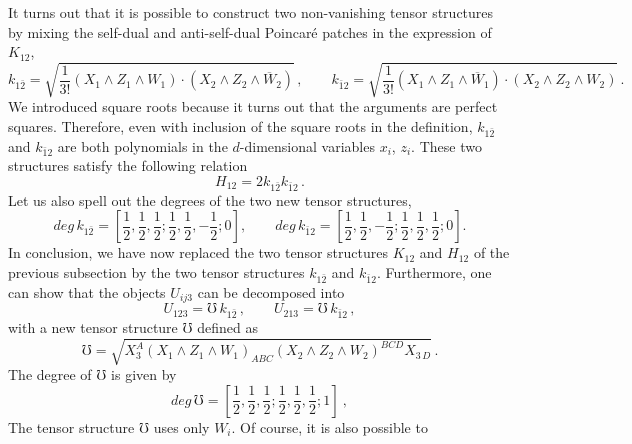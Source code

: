 \documentclass{article}
\def\mK{k}
\begin{document}
It turns out that it is possible to construct two non-vanishing tensor structures 
by mixing the self-dual and anti-self-dual Poincar\'e patches in the expression of $K_{12}$,
\begin{equation}
    \mK_{1\bar{2}}=\sqrt{\frac{1}{3!}\left(X_1\wedge Z_1\wedge W_1\right)\cdot \left(X_2\wedge 
    Z_2 \wedge \overline{W}_2\right)}\,, 
    \qquad \mK_{\bar{1}2}=\sqrt{\frac{1}{3!}\left(X_1\wedge Z_1\wedge \overline{W}_1\right)
    \cdot \left(X_2\wedge Z_2 \wedge W_2\right)}\,.
\end{equation}
We introduced square roots because it turns out 
that the arguments are perfect squares. Therefore, 
even with inclusion of the square roots in the definition, $\mK_{1\bar{2}}$ and
$\mK_{\bar{1}2}$ are both polynomials in the $d$-dimensional variables $x_i$, 
$z_i$. These two structures satisfy the following relation
\begin{equation}
    H_{12}= 2 \mK_{1\bar{2}} \mK_{\bar{1}2}\,. 
    \label{relationHKKbar}
\end{equation}
Let us also spell out the degrees of the two new tensor structures, 
\begin{equation}
    \textit{deg}\, \mK_{1\bar{2}}=\left[\frac{1}{2},\frac{1}{2},\frac{1}{2};\frac{1}{2},
    \frac{1}{2},-\frac{1}{2};0\right], \qquad \textit{deg}\,
    \mK_{\bar{1}2}=\left[\frac{1}{2},\frac{1}{2},-\frac{1}{2};\frac{1}{2},\frac{1}{2},
    \frac{1}{2};0\right]. 
\end{equation}
In conclusion, we have now replaced the two tensor structures $K_{12}$ and $H_{12}$ of the previous subsection by the two tensor structures $\mK_{1\bar{2}}$
and $\mK_{\bar{1}2}$. Furthermore, one can show that the objects $U_{ij3}$ can be 
decomposed into
\begin{equation}
    U_{123}=\mho\, \mK_{1\bar{2}}\,, \qquad U_{213}=\mho\, \mK_{\bar{1}2}\,,
    \label{Utensorstructure_mho}
\end{equation}
with a new tensor structure $\mho$ defined as 
\begin{equation}
    \mho = \sqrt{X_3^A\left(X_1\wedge Z_1\wedge W_1\right)_{ABC}
    \left(X_2\wedge Z_2 \wedge W_2\right)^{BCD} X_{3\,D}}\,.
\end{equation}
The degree of $\mho$ is given by 
\begin{equation}
    \textit{deg}\, \mho =\left[\frac{1}{2},\frac{1}{2},\frac{1}{2};\frac{1}{2},
    \frac{1}{2},\frac{1}{2};1 \right]\ ,
\end{equation}
The tensor structure $\mho$ uses only $W_i$. Of course, it is also possible to 
\end{document}
